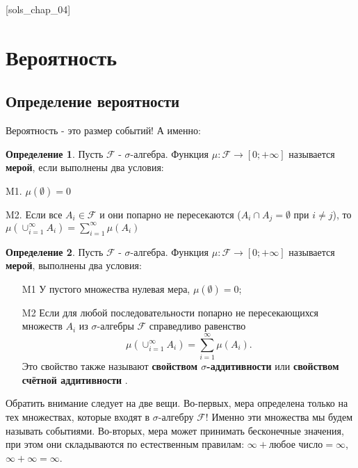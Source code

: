 \documentclass[pdftex, 12pt, a4paper]{article}
\def\F{\ensuremath{\mathcal{F}}} %
\def\s{\ensuremath{\sigma}}
\theoremstyle{definition} %
\newtheorem*{mydef}{Определение}
\numberwithin{problem}{section}
\newcommand{\indef}[1]{\textbf{#1}}
\numberwithin{blits}{section}
\begin{document}
[sols_chap_04]




\section{Вероятность}

\subsection{Определение вероятности}

Вероятность - это размер событий! А именно:

\begin{mydef} Пусть $\mathcal{F}$ - $\sigma$-алгебра. Функция $\mu:\mathcal{F} \rightarrow [0;+\infty]$ называется \indef{мерой}, если выполнены два условия:

M1. $\mu(\emptyset)=0$

M2. Если все $A_{i}\in \mathcal{F}$ и они попарно не пересекаются ($A_{i}\cap A_{j}=\emptyset$ при $i\neq j$), то $\mu\left(\cup_{i=1}^{\infty} A_{i}\right)=\sum_{i=1}^{\infty}\mu(A_{i})$
\end{mydef}

\begin{mydef} Пусть $\mathcal{F}$ - $\sigma$-алгебра. Функция $\mu:\mathcal{F} \rightarrow [0;+\infty]$ называется \indef{мерой},  выполнены два условия: 
\begin{itemize}
\item[M1]  У пустого множества нулевая мера, $\mu(\emptyset)=0$;

\item[M2]  Если для любой последовательности попарно не пересекающихся множеств $A_{i}$ из \s-алгебры $\F$ справедливо равенство \[\mu\left(\cup_{i=1}^{\infty} A_{i}\right)=\sum_{i=1}^{\infty}\mu(A_{i}).\] Это свойство также называют \indef{свойством \s-аддитивности} или \indef{свойством  счётной аддитивности}  \index{\s-аддитивность}  .
\end{itemize}
\end{mydef}

Обратить внимание следует на две вещи. Во-первых, мера определена только на тех множествах, которые входят в \s-алгебру $\F$! Именно эти множества мы будем называть событиями. Во-вторых, мера может принимать бесконечные значения, при этом они складываются по естественным правилам: $\infty+\text{любое число}=\infty$, $\infty+\infty=\infty$.
\end{document}
